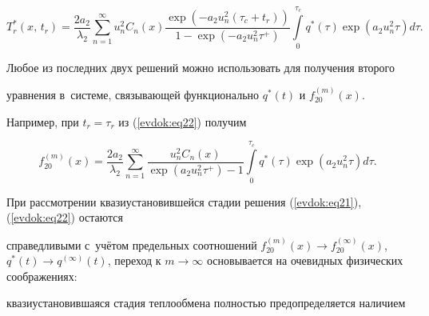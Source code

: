 \begin{equation}

\label{evdok:eq22}

T_r^\ast (x,\,t_r ) = 

\frac{2a_2 }{\lambda _2 }

\sum\limits_{n = 1}^\infty 

u_n^2 C_n (x)\frac{\exp \left(  - a_2 u_n^2 (\tau _c + t_r ) \right)}

{ 1 -\exp \left( - a_2 u_n^2 \tau ^ + \right)}

\int\limits_0^{\tau _c } q^\ast (\tau )\exp (a_2 u_n^2 \tau )d\tau.

\end{equation}











Любое из последних двух решений можно использовать для получения второго 

уравнения в~системе, связывающей функционально $q^\ast (t)$ и $f_{20}^{(m)}(x)$. 

Например, при $t_r = \tau _r $ из (\ref{evdok:eq22}) получим 

\begin{equation}

\label{evdok:eq23}

f_{20}^{(m)} (x) = 

\frac{2a_2 }{\lambda _2 }

\sum\limits_{n = 1}^\infty 

\frac{u_n^2 C_n (x)}

{\exp \left(a_2 u_n^2 \tau ^ + \right) - 1}

\int\limits_0^{\tau _c} q^\ast (\tau )\exp \left(a_2 u_n^2 \tau \right)d\tau.

\end{equation}



При рассмотрении квазиустановившейся стадии решения (\ref{evdok:eq21}), (\ref{evdok:eq22}) остаются 

справедливыми с~учётом предельных соотношений $f_{20}^{(m)} (x) \to 

f_{20}^{(\infty )} (x)$, $q^\ast (t) \to q^{(\infty )}(t)$, переход к $m \to 

\infty $ основывается на очевидных физических соображениях: 

квазиустановившаяся стадия теплообмена полностью предопределяется наличием 

